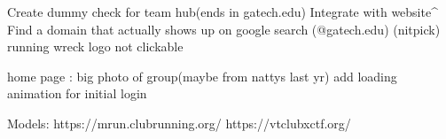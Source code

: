 
Create dummy check for team hub(ends in gatech.edu)
Integrate with website^
Find a domain that actually shows up on google search (@gatech.edu)
(nitpick) running wreck logo not clickable

home page :
    big photo of group(maybe from nattys last yr)
    add loading animation for initial login


Models: https://mrun.clubrunning.org/
        https://vtclubxctf.org/